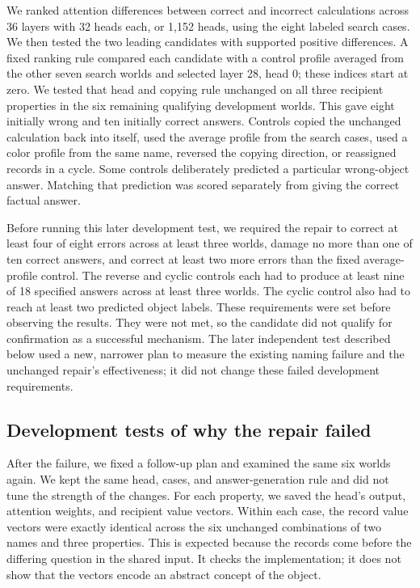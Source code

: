 \documentclass[10pt,letterpaper]{article}
\begin{document}
We ranked attention differences between correct and incorrect calculations across 36 layers with 32 heads each, or 1,152 heads, using the eight labeled search cases. We then tested the two leading candidates with supported positive differences. A fixed ranking rule compared each candidate with a control profile averaged from the other seven search worlds and selected layer 28, head 0; these indices start at zero. We tested that head and copying rule unchanged on all three recipient properties in the six remaining qualifying development worlds. This gave eight initially wrong and ten initially correct answers. Controls copied the unchanged calculation back into itself, used the average profile from the search cases, used a color profile from the same name, reversed the copying direction, or reassigned records in a cycle. Some controls deliberately predicted a particular wrong-object answer. Matching that prediction was scored separately from giving the correct factual answer.


Before running this later development test, we required the repair to correct at least four of eight errors across at least three worlds, damage no more than one of ten correct answers, and correct at least two more errors than the fixed average-profile control. The reverse and cyclic controls each had to produce at least nine of 18 specified answers across at least three worlds. The cyclic control also had to reach at least two predicted object labels. These requirements were set before observing the results. They were not met, so the candidate did not qualify for confirmation as a successful mechanism. The later independent test described below used a new, narrower plan to measure the existing naming failure and the unchanged repair's effectiveness; it did not change these failed development requirements.


\subsection*{Development tests of why the repair failed}

After the failure, we fixed a follow-up plan and examined the same six worlds again. We kept the same head, cases, and answer-generation rule and did not tune the strength of the changes. For each property, we saved the head's output, attention weights, and recipient value vectors. Within each case, the record value vectors were exactly identical across the six unchanged combinations of two names and three properties. This is expected because the records come before the differing question in the shared input. It checks the implementation; it does not show that the vectors encode an abstract concept of the object.
\end{document}
